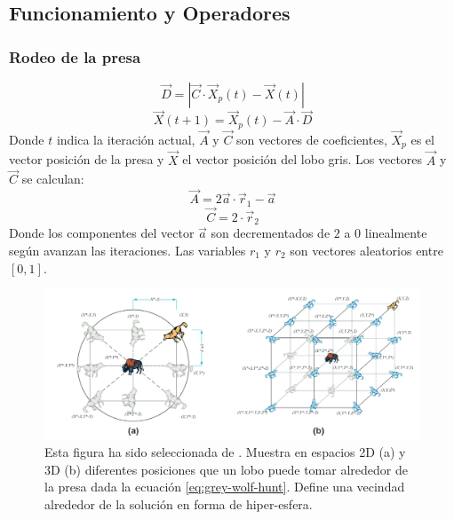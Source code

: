 \subsection{Funcionamiento y Operadores}

\subsubsection{Rodeo de la presa}
\begin{equation}
    \vec{D}=|\vec{C}\cdot\vec{X}_p(t)-\vec{X}(t)|
\end{equation}
\begin{equation}
    \vec{X}(t+1)=\vec{X}_p(t)-\vec{A}\cdot\vec{D}
    \label{eq:grey-wolf-hunt}
\end{equation}
Donde $t$ indica la iteración actual, $\vec{A}$ y $\vec{C}$ son vectores de coeficientes, $\vec{X}_p$ es el vector posición de la presa y $\vec{X}$ el vector posición del lobo gris.
Los vectores $\vec{A}$ y $\vec{C}$ se calculan:
\begin{equation}
    \vec{A}=2\vec{a}\cdot\vec{r}_1-\vec{a}
\end{equation}
\begin{equation}
    \vec{C}=2\cdot\vec{r}_2
\end{equation}
Donde los componentes del vector $\vec{a}$ son decrementados de $2$ a $0$ linealmente según avanzan las iteraciones. Las variables  $r_1$ y $r_2$ son vectores aleatorios entre $[0,1]$.

\begin{figure}[htp]
    \begin{center}
        \includegraphics[width=1\textwidth]{imagenes/grey-wolf-hunt.png}
    \end{center}
    \caption[Rodeo de la presa en 2D y 3D]{Esta figura ha sido seleccionada de \cite{mirjalili_grey_2014}. Muestra en espacios 2D (a) y 3D (b) diferentes posiciones que un lobo puede tomar alrededor de la presa dada la ecuación \ref{eq:grey-wolf-hunt}. Define una vecindad alrededor de la solución en forma de hiper-esfera.}
\end{figure}

